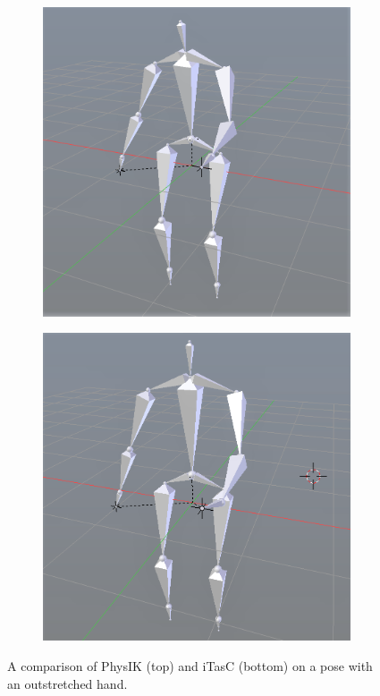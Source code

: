 \documentclass[10pt,twocolumn,letterpaper]{article}
\begin{document}
\begin{figure}[h]
    \centering
    \begin{subfigure}{\columnwidth}
        \centering
        \includegraphics[width=.8\linewidth]{pose-hand.png}
    \end{subfigure}
    
    \begin{subfigure}{\columnwidth}
        \centering
        \includegraphics[width=.8\linewidth]{pose-hand-itasc.png}
    \end{subfigure}

    \caption{A comparison of PhysIK (top) and iTasC (bottom) on a pose with an outstretched hand.}
    \label{img:hand}
\end{figure}
\end{document}
